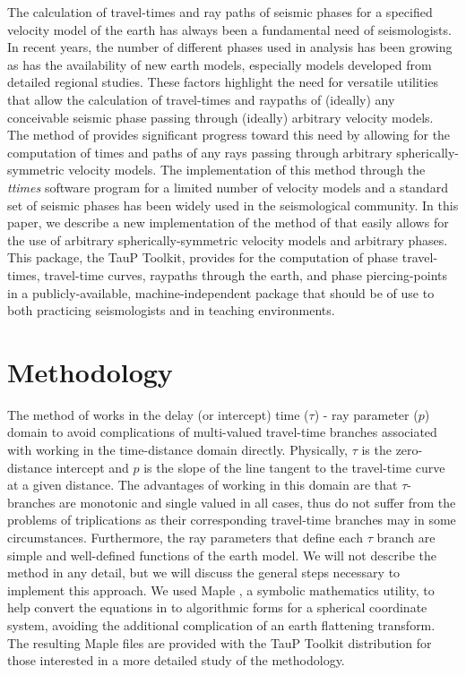 The calculation of travel-times and ray paths of seismic phases for 
a specified velocity model of the earth has always been a fundamental need of seismologists.
In recent years, the number of different phases used in analysis has been growing as has the
availability of new earth models, especially models developed from detailed regional
studies.
These factors highlight the need for versatile utilities that allow the calculation of
travel-times and raypaths of (ideally) any conceivable seismic phase passing through 
(ideally) arbitrary velocity models.
The method of  provides significant progress toward this need
by allowing for the computation of times and paths
of any rays passing through arbitrary spherically-symmetric velocity models.
The implementation of this method through the \textit{ttimes} software program \cite{iasp} for a limited
number of velocity models and a standard set of seismic
phases has been widely used in the seismological community.
In this paper, we describe a new implementation of the method of 
that easily allows for the use of arbitrary spherically-symmetric velocity
models and arbitrary phases.  
This package, the TauP Toolkit, provides for the computation of phase travel-times,
travel-time curves, raypaths through the earth, and phase piercing-points
in a publicly-available, machine-independent package that should be of use to both
practicing seismologists and in teaching environments.

\section*{Methodology}

The method of  works in the 
delay (or intercept) time ($\tau$) - ray
parameter ($p$) domain to avoid complications of multi-valued travel-time branches
associated with working in the time-distance domain directly.
Physically, $\tau$ is the zero-distance intercept and $p$ is the slope of the line tangent
to the travel-time curve at a given distance.
The advantages of working in this domain are that $\tau$-branches are monotonic and single
valued in all cases, thus do not suffer from the problems of triplications as their corresponding
travel-time branches may in some circumstances.  Furthermore, the ray parameters that define
each $\tau$ branch are simple and well-defined functions of the earth model.
We will not describe the method in any detail, but we will discuss the general steps
necessary to implement this approach.
We used Maple , a symbolic mathematics utility, to help convert the equations in
 to algorithmic forms 
for a spherical coordinate system, avoiding the additional complication 
of an earth flattening transform.  
The resulting Maple files are provided with the TauP Toolkit distribution for those
interested in a more detailed study of the methodology.

